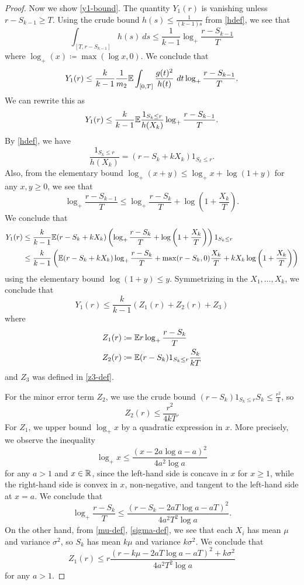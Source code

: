\begin{proof}
Now we show \eqref{y1-bound}.  The quantity $Y_1(r)$ is vanishing unless $r-S_{k-1} \geq T$.  Using the crude bound $h(s) \leq \frac{1}{(k-1)s}$ from \eqref{hdef}, we see that
$$ \int_{[T,r-S_{k-1}]} h(s)\ ds \leq \frac{1}{k-1} \log_+ \frac{r-S_{k-1}}{T}$$
where $\log_+(x) \coloneqq \max(\log x, 0)$.  We conclude that
$$ Y_1(r) \leq \frac{k}{k-1} \frac{1}{m_2} \mathbb{E} \int_{[0,T]} \frac{g(t)^2}{h(t)}\ dt \log_+ \frac{r-S_{k-1}}{T}.$$
We can rewrite this as
$$ Y_1(r) \leq \frac{k}{k-1} \mathbb{E} \frac{1_{S_k \leq r}}{h(X_k)} \log_+ \frac{r-S_{k-1}}{T}.$$
By \eqref{hdef}, we have
$$ \frac{1_{S_k \leq r}}{h(X_k)} = (r-S_k+kX_k) 1_{S_k \leq r}.$$
Also, from the elementary bound $\log_+(x+y) \leq \log_+ x + \log(1+y)$ for any $x,y \geq 0$, we see that
$$ \log_+ \frac{r-S_{k-1}}{T} \leq \log_+ \frac{r-S_{k}}{T} + \log\left(1+\frac{X_k}{T}\right).$$
We conclude that
\begin{align*}
Y_1(r) &\leq \frac{k}{k-1} \mathbb{E} (r-S_k+kX_k) \left( \log_+ \frac{r-S_{k}}{T} + \log\left(1+\frac{X_k}{T}\right) \right) 1_{S_k \leq r}\\
&\leq \frac{k}{k-1} \left( \mathbb{E} (r-S_k+kX_k) \log_+ \frac{r-S_{k}}{T} + \max(r-S_k,0) \frac{X_k}{T} + k X_k \log\left(1+\frac{X_k}{T}\right) \right)
\end{align*}
using the elementary bound $\log(1+y) \leq y$.  Symmetrizing in the $X_1,\dots,X_k$, we conclude that
\begin{equation}\label{y1r}
 Y_1(r) \leq \frac{k}{k-1} (Z_1(r) + Z_2(r) + Z_3)
\end{equation}
where
\begin{align*}
Z_1(r) &\coloneqq \mathbb{E} r \log_+ \frac{r-S_k}{T} \\
Z_2(r) &\coloneqq \mathbb{E} (r-S_k) 1_{S_k \leq r} \frac{S_k}{kT} 
\end{align*}
and $Z_3$ was defined in \eqref{z3-def}.

For the minor error term $Z_2$, we use the crude bound $(r-S_k) 1_{S_k \leq r} S_k \leq \frac{r^2}{4}$, so
\begin{equation}\label{z2r}
Z_2(r) \leq \frac{r^2}{4kT}.
\end{equation}
For $Z_1$, we upper bound $\log_+ x$ by a quadratic expression in $x$.  More precisely, we observe the inequality
$$ \log_+ x \leq \frac{(x-2a\log a-a)^2}{4a^2 \log a}$$
for any $a > 1$ and $x \in \mathbb{R}$, since the left-hand side is concave in $x$ for $x \geq 1$, while the right-hand side is convex in $x$, non-negative, and tangent to the left-hand side at $x=a$.  We conclude that
$$ \log_+ \frac{r-S_k}{T} \leq \frac{(r-S_k-2aT\log a-aT)^2}{4a^2 T^2 \log a}.$$
On the other hand, from \eqref{mu-def}, \eqref{sigma-def}, we see that each $X_i$ has mean $\mu$ and variance $\sigma^2$, so $S_k$ has mean $k\mu$ and variance $k\sigma^2$.  We conclude that
$$ Z_1(r) \leq r \frac{ (r-k\mu-2aT\log a-aT)^2 + k \sigma^2}{4a^2 T^2 \log a}$$
for any $a > 1$.


\end{proof}
